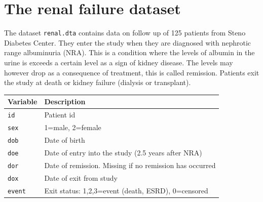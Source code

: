 \documentclass[
]{book}
\newcounter{none} %
\begin{document}
\section{The renal failure dataset}\label{the-renal-failure-dataset}

The dataset \texttt{renal.dta} contains data on follow up of 125
patients from Steno Diabetes Center. They enter the study when they
are diagnosed with nephrotic range albuminuria (NRA). This is a
condition where the levels of albumin in the urine is exceeds a
certain level as a sign of kidney disease. The levels may however drop
as a consequence of treatment, this is called remission. Patients exit
the study at death or kidney failure (dialysis or transplant).

{\def\LTcaptype{none} %
\begin{longtable}[]{@{}ll@{}}
\toprule\noalign{}
Variable & Description \\
\midrule\noalign{}
\endhead
\bottomrule\noalign{}
\endlastfoot
\texttt{id} & Patient id \\
\texttt{sex} & 1=male, 2=female \\
\texttt{dob} & Date of birth \\
\texttt{doe} & Date of entry into the study (2.5 years after NRA) \\
\texttt{dor} & Date of remission. Missing if no remission has occurred \\
\texttt{dox} & Date of exit from study \\
\texttt{event} & Exit status: 1,2,3=event (death, ESRD), 0=censored \\
\end{longtable}
}
\end{document}

